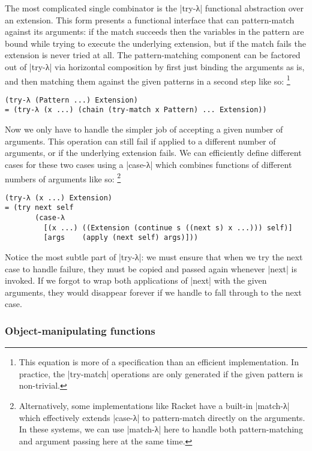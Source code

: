 The most complicated single combinator is the \scm|try-λ| functional abstraction over an extension.
This form presents a functional interface that can pattern-match against its arguments:
if the match succeeds then the variables in the pattern are bound while trying to execute the underlying extension,
but if the match fails the extension is never tried at all.
The pattern-matching component can be factored out of \scm|try-λ| via horizontal composition by first just binding the arguments as is, and then matching them against the given patterns in a second step like so:%
\footnote{This equation is more of a specification than an efficient implementation.
  In practice, the \scm|try-match| operations are only generated if the given pattern is non-trivial.}
\begin{verbatim}
(try-λ (Pattern ...) Extension)
= (try-λ (x ...) (chain (try-match x Pattern) ... Extension))
\end{verbatim}
Now we only have to handle the simpler job of accepting a given number of arguments.  This operation can still fail if applied to a different number of arguments, or if the underlying extension fails.
We can efficiently define different cases for these two cases using a \scm|case-λ| which combines functions of different numbers of arguments like so:
\footnote{Alternatively, some implementations like Racket have a built-in \scm|match-λ| which effectively extends \scm|case-λ| to pattern-match directly on the arguments.
  In these systems, we can use \scm|match-λ| here to handle both pattern-matching and argument passing here at the same time.}
\begin{verbatim}
(try-λ (x ...) Extension)
= (try next self
       (case-λ
         [(x ...) ((Extension (continue s ((next s) x ...))) self)]
         [args    (apply (next self) args)]))
\end{verbatim}
Notice the most subtle part of \scm|try-λ|:
we must ensure that when we try the next case to handle failure, they must be copied and passed again whenever \scm|next| is invoked.
If we forgot to wrap both applications of \scm|next| with the given arguments, they would disappear forever if we handle to fall through to the next case.

\subsubsection{Object-manipulating functions}

